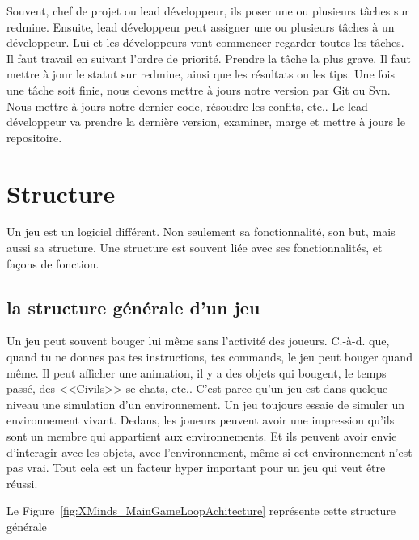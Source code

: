 Souvent, chef de projet ou lead développeur, ils poser une ou plusieurs tâches sur redmine. Ensuite, lead développeur peut assigner une ou plusieurs tâches à un développeur. Lui et les développeurs vont commencer regarder toutes les tâches. Il faut travail en suivant l'ordre de priorité. Prendre la tâche la plus grave. Il faut mettre à jour le statut sur redmine, ainsi que les résultats ou les tips. Une fois une tâche soit finie, nous devons mettre à jours notre version par Git ou Svn. Nous mettre à jours notre dernier code, résoudre les confits, etc.. Le lead développeur va prendre la dernière version, examiner, marge et mettre à jours le repositoire.




\section{Structure} %
\label{sec:structure}

Un jeu est un logiciel différent. Non seulement sa fonctionnalité, son but, mais aussi sa structure. Une structure est souvent liée avec ses fonctionnalités, et façons de fonction. 

\subsection{la structure générale d'un jeu} %
\label{sub:le_structure_général_d_un_jeu}

Un jeu peut souvent bouger lui même sans l'activité des joueurs. C.-à-d. que, quand tu ne donnes pas tes instructions, tes commands, le jeu peut bouger quand même. Il peut afficher une animation, il y a des objets qui bougent, le temps passé, des <<Civils>> se chats, etc.. C'est parce qu’un jeu est dans quelque niveau une simulation d'un environnement. Un jeu toujours essaie de simuler un environnement vivant. Dedans, les joueurs peuvent avoir une impression qu’ils sont un membre qui appartient aux environnements. Et ils peuvent avoir envie d’interagir avec les objets, avec l'environnement, même si cet environnement n'est pas vrai. Tout cela est un facteur hyper important pour un jeu qui veut être réussi.

Le Figure~\ref{fig:XMinds_MainGameLoopAchitecture} représente cette structure générale

